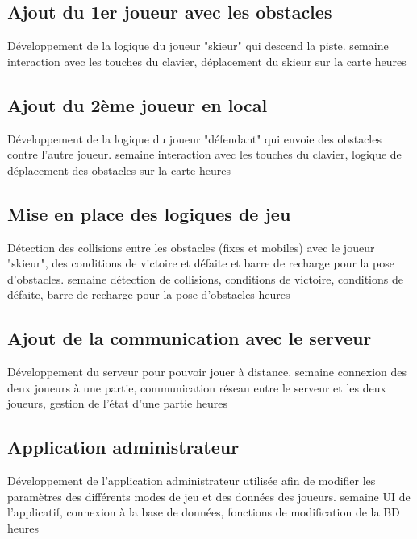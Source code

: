 \documentclass[a4paper,11pt]{article}
\begin{document}
		\subsection{Ajout du 1er joueur avec les obstacles}
		\begin{enumerate}[labelwidth=5em,leftmargin=8em]
			\objectif Développement de la logique du joueur "skieur" qui descend la piste.
			 semaine
			\partageTache interaction avec les touches du clavier, déplacement du skieur sur la carte
			 heures
		\end{enumerate}
		\subsection{Ajout du 2ème joueur en local}
		\begin{enumerate}[labelwidth=5em,leftmargin=8em]
			\objectif Développement de la logique du joueur "défendant" qui envoie des obstacles contre l'autre joueur.
			 semaine
			\partageTache interaction avec les touches du clavier, logique de déplacement des obstacles sur la carte
			 heures
		\end{enumerate}
		\subsection{Mise en place des logiques de jeu}
		\begin{enumerate}[labelwidth=5em,leftmargin=8em]
			\objectif Détection des collisions entre les obstacles (fixes et mobiles) avec le joueur "skieur", des conditions de victoire et défaite et barre de recharge pour la pose d'obstacles.
			 semaine
			\partageTache détection de collisions, conditions de victoire, conditions de défaite, barre de recharge pour la pose d'obstacles
			 heures
		\end{enumerate}
		\subsection{Ajout de la communication avec le serveur}
		\begin{enumerate}[labelwidth=5em,leftmargin=8em]
			\objectif Développement du serveur pour pouvoir jouer à distance.
			 semaine
			\partageTache connexion des deux joueurs à une partie, communication réseau entre le serveur et les deux joueurs, gestion de l'état d'une partie
			 heures
		\end{enumerate}
		\subsection{Application administrateur}
		\begin{enumerate}[labelwidth=5em,leftmargin=8em]
			\objectif Développement de l'application administrateur utilisée afin de modifier les paramètres des différents modes de jeu et des données des joueurs.
			 semaine
			\partageTache UI de l'applicatif, connexion à la base de données, fonctions de modification de la BD
			 heures
		\end{enumerate}
\end{document}
